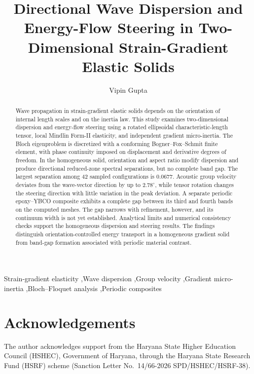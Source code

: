\documentclass[preprint,12pt,authoryear]{elsarticle}
\begin{document}
\begin{frontmatter}
\title{Directional Wave Dispersion and Energy-Flow Steering in Two-Dimensional Strain-Gradient Elastic Solids}
\author[gu]{Vipin Gupta}
\address[gu]{Department of Mathematics, Gurugram University, Gurugram 122505, Haryana, India}
\begin{abstract}
Wave propagation in strain-gradient elastic solids depends on the orientation of internal length scales and on the inertia law. This study examines two-dimensional dispersion and energy-flow steering using a rotated ellipsoidal characteristic-length tensor, local Mindlin Form-II elasticity, and independent gradient micro-inertia. The Bloch eigenproblem is discretized with a conforming Bogner--Fox--Schmit finite element, with phase continuity imposed on displacement and derivative degrees of freedom. In the homogeneous solid, orientation and aspect ratio modify dispersion and produce directional reduced-zone spectral separations, but no complete band gap. The largest separation among 42 sampled configurations is 0.0677. Acoustic group velocity deviates from the wave-vector direction by up to $2.78^\circ$, while tensor rotation changes the steering direction with little variation in the peak deviation. A separate periodic epoxy--YBCO composite exhibits a complete gap between its third and fourth bands on the computed meshes. The gap narrows with refinement, however, and its continuum width is not yet established. Analytical limits and numerical consistency checks support the homogeneous dispersion and steering results. The findings distinguish orientation-controlled energy transport in a homogeneous gradient solid from band-gap formation associated with periodic material contrast.
\end{abstract}
\begin{keyword}
Strain-gradient elasticity \sep Wave dispersion \sep Group velocity \sep Gradient micro-inertia \sep Bloch--Floquet analysis \sep Periodic composites
\end{keyword}
\end{frontmatter}
\let\cite\citep









\section*{Acknowledgements}
The author acknowledges support from the Haryana State Higher Education Council (HSHEC), Government of Haryana, through the Haryana State Research Fund (HSRF) scheme (Sanction Letter No.\ 14/66-2026 SPD/HSHEC/HSRF-38).
\end{document}
